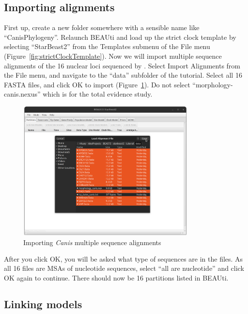 \documentclass[12pt]{article}
\begin{document}
\subsection{Importing alignments}
\label{subsec:importingAlignments}

First up, create a new folder somewhere with a sensible name like
``CanisPhylogeny''. Relaunch BEAUti and load up the strict clock
template by selecting ``StarBeast2'' from the Templates submenu of the File menu
(Figure~\ref{fig:strictClockTemplate}). Now we will import multiple sequence
alignments of the 16 nuclear loci sequenced by \cite{LindbladToh2005}. Select
Import Alignments from the File menu, and navigate to the ``data'' subfolder
of the tutorial. Select all 16 FASTA files, and click OK to import
(Figure~\ref{fig:fastaFileImport}). Do not select ``morphology-canis.nexus''
which is for the total evidence study.

\begin{figure}[htb!]
\centering
\includegraphics[width=0.8\textwidth]{figures/fastaFileImport.png}
\caption
{Importing \textit{Canis} multiple sequence alignments}
\label{fig:fastaFileImport}
\end{figure}

After you click OK, you will be asked what type of sequences are in the files.
As all 16 files are MSAs of nucleotide sequences, select ``all are nucleotide''
and click OK again to continue. There should now be 16 partitions listed in
BEAUti.

\subsection{Linking models}
\label{subsec:linkingModels}
\end{document}
